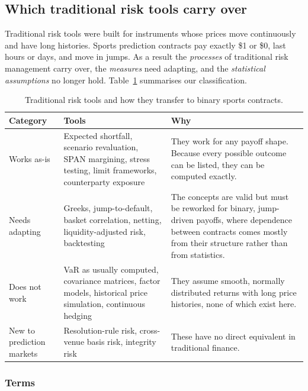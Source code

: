 \subsection{Which traditional risk tools carry over}\label{sec:tools}


Traditional risk tools were built for instruments whose prices move continuously and have long histories. Sports prediction contracts pay exactly \$1 or \$0, last hours or days, and move in jumps. As a result the \emph{processes} of traditional risk management carry over, the \emph{measures} need adapting, and the \emph{statistical assumptions} no longer hold. Table~\ref{tab:tools} summarises our classification.

\begin{table}[H]
\centering
\small
\begin{tabular}{p{2.5cm}p{5.0cm}p{7.6cm}}
\toprule
\textbf{Category} & \textbf{Tools} & \textbf{Why} \\
\midrule
Works as-is & Expected shortfall, scenario revaluation, SPAN margining, stress testing, limit frameworks, counterparty exposure & They work for any payoff shape. Because every possible outcome can be listed, they can be computed exactly. \\
Needs adapting & Greeks, jump-to-default, basket correlation, netting, liquidity-adjusted risk, backtesting & The concepts are valid but must be reworked for binary, jump-driven payoffs, where dependence between contracts comes mostly from their structure rather than from statistics. \\
Does not work & VaR as usually computed, covariance matrices, factor models, historical price simulation, continuous hedging & They assume smooth, normally distributed returns with long price histories, none of which exist here. \\
New to prediction markets & Resolution-rule risk, cross-venue basis risk, integrity risk & These have no direct equivalent in traditional finance. \\
\bottomrule
\end{tabular}
\caption{Traditional risk tools and how they transfer to binary sports contracts.}
\label{tab:tools}
\end{table}

\subsubsection{Terms}

